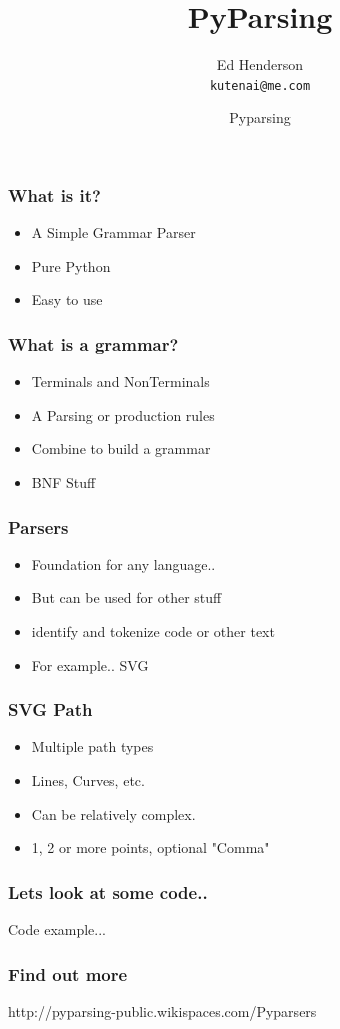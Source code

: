 \documentclass[12pt,presentation]{beamer}
\title{PyParsing}
\author{Ed Henderson \\ \texttt{kutenai@me.com}}
\date[]{Pyparsing}
\begin{document}
\frame{\titlepage}

\begin{frame}
	\frametitle{What is it?}
	
	\begin{itemize}[<+- | alert@+>]
		\item A Simple Grammar Parser
		\item Pure Python
		\item Easy to use
	\end{itemize}

\end{frame}

\begin{frame}
	\frametitle{What is a grammar?}
	
	\begin{itemize}[<+- | alert@+>]
		\item Terminals and NonTerminals
		\item A Parsing or production rules
		\item Combine to build a grammar
		\item BNF Stuff
	\end{itemize}
	
\end{frame}

\begin{frame}
	\frametitle{Parsers}
	
	\begin{itemize}[<+- | alert@+>]
		\item Foundation for any language..
		\item But can be used for other stuff
		\item identify and tokenize code or other text
		\item For example.. SVG
	\end{itemize}
	
\end{frame}

\begin{frame}
	\frametitle{SVG Path}
	
	\begin{itemize}[<+- | alert@+>]
		\item Multiple path types
		\item Lines, Curves, etc.
		\item Can be relatively complex.
		\item 1, 2 or more points, optional "Comma"
	\end{itemize}
	
\end{frame}

\begin{frame}
	\frametitle{Lets look at some code..}

	Code example...	
	
\end{frame}

\begin{frame}
	\frametitle{Find out more}
	
	http://pyparsing-public.wikispaces.com/Pyparsers
	
\end{frame}
\end{document}
